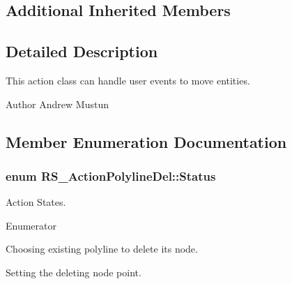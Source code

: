\subsection*{Additional Inherited Members}


\subsection{Detailed Description}
This action class can handle user events to move entities.

\begin{DoxyAuthor}{Author}
Andrew Mustun 
\end{DoxyAuthor}


\subsection{Member Enumeration Documentation}
\hypertarget{classRS__ActionPolylineDel_a9335b7146f6cb2176cabec390b784e67}{
\subsubsection[{Status}]{\setlength{\rightskip}{0pt plus 5cm}enum {\bf R\-S\-\_\-\-Action\-Polyline\-Del\-::\-Status}}}\label{classRS__ActionPolylineDel_a9335b7146f6cb2176cabec390b784e67}
Action States. \begin{Desc}
\item[Enumerator]\par
\begin{description}
\item[{\em 
\hypertarget{classRS__ActionPolylineDel_a9335b7146f6cb2176cabec390b784e67a3c799d7e60c67b37e875afc16482548e}{Choose\-Entity}\label{classRS__ActionPolylineDel_a9335b7146f6cb2176cabec390b784e67a3c799d7e60c67b37e875afc16482548e}
}]Choosing existing polyline to delete its node. \item[{\em 
\hypertarget{classRS__ActionPolylineDel_a9335b7146f6cb2176cabec390b784e67a2a26c7f0c6bba4b2636c9d8a1d5ee0ff}{Set\-Del\-Point}\label{classRS__ActionPolylineDel_a9335b7146f6cb2176cabec390b784e67a2a26c7f0c6bba4b2636c9d8a1d5ee0ff}
}]Setting the deleting node point. \end{description}
\end{Desc}


